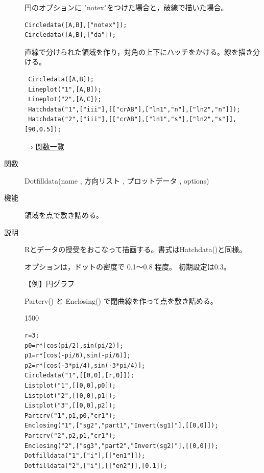 \documentclass[papersize,a4paper,12pt,uplatex]{jsarticle}
\begin{document}
\begin{description}

 
円のオプションに "notex"をつけた場合と，破線で描いた場合。
\begin{verbatim}
Circledata([A,B],["notex"]);
Circledata([A,B],["da"]);
 \end{verbatim}

\hspace{10mm}  

直線で分けられた領域を作り，対角の上下にハッチをかける。線を描き分ける。
\begin{verbatim}
 Circledata([A,B]);
 Lineplot("1",[A,B]);
 Lineplot("2",[A,C]);
 Hatchdata("1",["iii"],[["crAB"],["ln1","n"],["ln2","n"]]);
 Hatchdata("2",["iii"],[["crAB"],["ln1","s"],["ln2","s"]],[90,0.5]);
\end{verbatim}

\hspace{40mm} 

\begin{flushright}\hyperlink{functionlist}{$\Rightarrow$関数一覧}\end{flushright}

\vspace{\baselineskip}
\hypertarget{dotfilldata}{}
\item[関数]Dotfilldata(name , 方向リスト , プロットデータ , options)
\item[機能]領域を点で敷き詰める。
\item[説明]Rとデータの授受をおこなって描画する。書式はHatchdata()と同様。

オプションは，ドットの密度で 0.1〜0.8 程度。 初期設定は0.3。

\vspace{\baselineskip}
【例】円グラフ

Partcrv() と Enclosing() で閉曲線を作って点を敷き詰める。


\begin{layer}{150}{0}
\end{layer}

\begin{verbatim}
r=3;
p0=r*[cos(pi/2),sin(pi/2)];
p1=r*[cos(-pi/6),sin(-pi/6)];
p2=r*[cos(-3*pi/4),sin(-3*pi/4)];
Circledata("1",[[0,0],[r,0]]);
Listplot("1",[[0,0],p0]);
Listplot("2",[[0,0],p1]);
Listplot("3",[[0,0],p2]);
Partcrv("1",p1,p0,"cr1");
Enclosing("1",["sg2","part1","Invert(sg1)"],[[0,0]]);
Partcrv("2",p2,p1,"cr1");
Enclosing("2",["sg3","part2","Invert(sg2)"],[[0,0]]);
Dotfilldata("1",["i"],[["en1"]]);
Dotfilldata("2",["i"],[["en2"]],[0.1]);
\end{verbatim}


\end{description}
\end{document}
